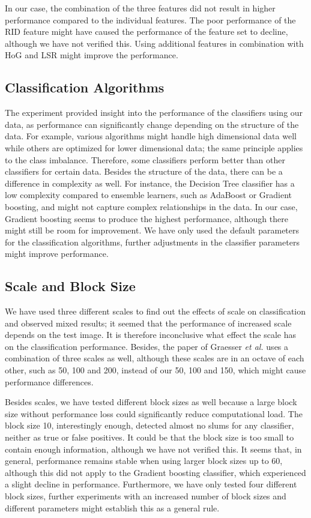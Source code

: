 In our case, the combination of the three features did not result in higher performance compared to the individual features. The poor performance of the RID feature might have caused the performance of the feature set to decline, although we have not verified this. Using additional features in combination with HoG and LSR might improve the performance.


\subsection{Classification Algorithms}
The experiment provided insight into the performance of the classifiers using our data, as performance can significantly change depending on the structure of the data. For example, various algorithms might handle high dimensional data well while others are optimized for lower dimensional data; the same principle applies to the class imbalance. Therefore, some classifiers perform better than other classifiers for certain data. Besides the structure of the data, there can be a difference in complexity as well. For instance, the Decision Tree classifier has a low complexity compared to ensemble learners,  such as AdaBoost or Gradient boosting, and might not capture complex relationships in the data. In our case, Gradient boosting seems to produce the highest performance, although there might still be room for improvement. We have only used the default parameters for the classification algorithms, further adjustments in the classifier parameters might improve performance.


\subsection{Scale and Block Size}
We have used three different scales to find out the effects of scale on classification and observed mixed results; it seemed that the performance of increased scale depends on the test image. It is therefore inconclusive what effect the scale has on the classification performance. Besides, the paper of Graesser \textit{et al.} uses a combination of three scales as well, although these scales are in an octave of each other, such as 50, 100 and 200, instead of our 50, 100 and 150, which might cause performance differences.
\newline

\noindent
Besides scales, we have tested different block sizes as well because a large block size without performance loss could significantly reduce computational load. The block size 10, interestingly enough, detected almost no slums for any classifier, neither as true or false positives. It could be that the block size is too small to contain enough information, although we have not verified this. It seems that, in general, performance remains stable when using larger block sizes up to 60, although this did not apply to the Gradient boosting classifier, which experienced a slight decline in performance. Furthermore, we have only tested four different block sizes, further experiments with an increased number of block sizes and different parameters might establish this as a general rule.

